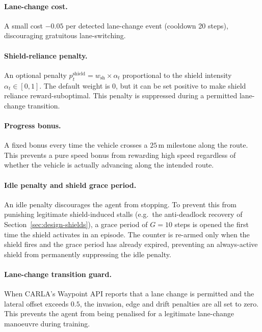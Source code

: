 \paragraph{Lane-change cost.}
A small cost \(-0.05\) per detected lane-change event (cooldown 20 steps), discouraging
gratuitous lane-switching.

\paragraph{Shield-reliance penalty.}
An optional penalty \(p^{\mathrm{shield}}_t = w_{\mathrm{sh}} \times \alpha_t\) proportional to
the shield intensity \(\alpha_t \in [0,1]\). The default weight is \(0\), but it can be set positive to
make shield reliance reward-suboptimal. This penalty is suppressed during a permitted lane-change transition.

\paragraph{Progress bonus.}
A fixed bonus every time the vehicle crosses a \(25\,\mathrm{m}\) milestone along the route. This
prevents a pure speed bonus from rewarding high speed regardless of whether the vehicle is
actually advancing along the intended route.


\paragraph{Idle penalty and shield grace period.}
An idle penalty discourages the agent from stopping. To prevent this from punishing legitimate
shield-induced stalls (e.g.\ the anti-deadlock recovery of Section~\ref{sec:design-shields}), a
grace period of \(G = 10\) steps is opened the first time the shield activates in an episode.
The counter is re-armed only when the shield fires and the grace period has already expired,
preventing an always-active shield from permanently suppressing the idle penalty.

\paragraph{Lane-change transition guard.}
When CARLA's Waypoint API reports that a lane change is permitted and the lateral offset exceeds
\(0.5\), the invasion, edge and drift penalties are all set to zero. This prevents the agent from
being penalised for a legitimate lane-change manoeuvre during training.

